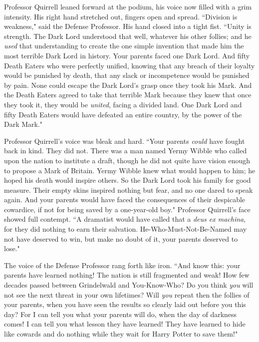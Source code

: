 Professor Quirrell leaned forward at the podium, his voice now filled with a grim intensity. His right hand stretched out, fingers open and spread. ``Division is weakness," said the Defense Professor. His hand closed into a tight fist. ``Unity is strength. The Dark Lord understood that well, whatever his other follies; and he \emph{used} that understanding to create the one simple invention that made him the most terrible Dark Lord in history. Your parents faced one Dark Lord. And fifty Death Eaters who were perfectly unified, knowing that any breach of their loyalty would be punished by death, that any slack or incompetence would be punished by pain. None could escape the Dark Lord's grasp once they took his Mark. And the Death Eaters agreed to take that terrible Mark because they knew that once they took it, they would be \emph{united}, facing a divided land. One Dark Lord and fifty Death Eaters would have defeated an entire country, by the power of the Dark Mark."

Professor Quirrell's voice was bleak and hard. ``Your parents \emph{could} have fought back in kind. They did not. There was a man named Yermy Wibble who called upon the nation to institute a draft, though he did not quite have vision enough to propose a Mark of Britain. Yermy Wibble knew what would happen to him; he hoped his death would inspire others. So the Dark Lord took his family for good measure. Their empty skins inspired nothing but fear, and no one dared to speak again. And your parents would have faced the consequences of their despicable cowardice, if not for being saved by a one-year-old boy." Professor Quirrell's face showed full contempt. ``A dramatist would have called that a \emph{deus ex machina}, for they did nothing to earn their salvation. He-Who-Must-Not-Be-Named may not have deserved to win, but make no doubt of it, your parents deserved to lose."

The voice of the Defense Professor rang forth like iron. ``And know this: your parents have learned nothing! The nation is still fragmented and weak! How few decades passed between Grindelwald and You-Know-Who? Do you think \emph{you} will not see the next threat in your own lifetimes? Will \emph{you} repeat then the follies of your parents, when you have seen the results so clearly laid out before you this day? For I can tell you what your parents will do, when the day of darkness comes! I can tell you what lesson they have learned! They have learned to hide like cowards and do nothing while they wait for Harry Potter to save them!"

